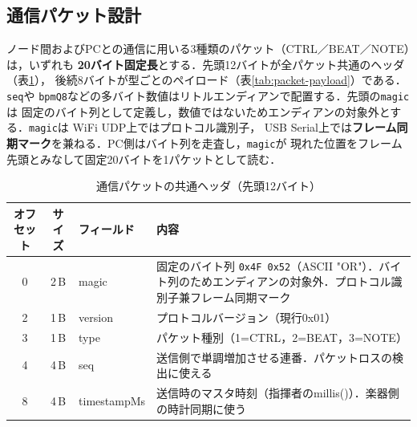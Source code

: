 \documentclass[lualatex,book,paper=a4paper,jafontsize=11.5pt,jafontscale=1.05]{jlreq}
\begin{document}
\subsection{通信パケット設計}
ノード間およびPCとの通信に用いる3種類のパケット（CTRL／BEAT／NOTE）は，いずれも
\textbf{20バイト固定長}とする．先頭12バイトが全パケット共通のヘッダ（表\ref{tab:packet-header}），
後続8バイトが型ごとのペイロード（表\ref{tab:packet-payload}）である．\texttt{seq}や
\texttt{bpmQ8}などの多バイト数値はリトルエンディアンで配置する．先頭の\texttt{magic}は
固定のバイト列として定義し，数値ではないためエンディアンの対象外とする．\texttt{magic}は
WiFi UDP上ではプロトコル識別子，
USB Serial上では\textbf{フレーム同期マーク}を兼ねる．PC側はバイト列を走査し，\texttt{magic}が
現れた位置をフレーム先頭とみなして固定20バイトを1パケットとして読む．
\begin{table}[H]\centering
  \caption{通信パケットの共通ヘッダ（先頭12バイト）}\label{tab:packet-header}
  \small
  \begin{tabularx}{\linewidth}{c c >{\raggedright\arraybackslash}p{2.2cm} X}
    \toprule
    オフセット & サイズ & フィールド & 内容 \\
    \midrule
    0 & 2\,B & magic & 固定のバイト列 \texttt{0x4F 0x52}（ASCII "OR"）．バイト列のためエンディアンの対象外．プロトコル識別子兼フレーム同期マーク \\
    2 & 1\,B & version & プロトコルバージョン（現行0x01） \\
    3 & 1\,B & type & パケット種別（1=CTRL，2=BEAT，3=NOTE） \\
    4 & 4\,B & seq & 送信側で単調増加させる連番．パケットロスの検出に使える \\
    8 & 4\,B & timestampMs & 送信時のマスタ時刻（指揮者のmillis()）．楽器側の時計同期に使う \\
    \bottomrule
  \end{tabularx}
\end{table}
\end{document}
